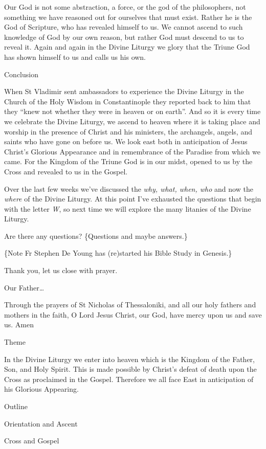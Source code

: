 \documentclass[
]{article}
\begin{document}
Our God is not some abstraction, a force, or the god of the
philosophers, not something we have reasoned out for ourselves that must
exist. Rather he is the God of Scripture, who has revealed himself to
us. We cannot ascend to such knowledge of God by our own reason, but
rather God must descend to us to reveal it. Again and again in the
Divine Liturgy we glory that the Triune God has shown himself to us and
calls us his own.

Conclusion

When St Vladimir sent ambassadors to experience the Divine Liturgy in
the Church of the Holy Wisdom in Constantinople they reported back to
him that they ``knew not whether they were in heaven or on earth''. And
so it is every time we celebrate the Divine Liturgy, we ascend to heaven
where it is taking place and worship in the presence of Christ and his
ministers, the archangels, angels, and saints who have gone on before
us. We look east both in anticipation of Jesus Christ's Glorious
Appearance and in remembrance of the Paradise from which we came. For
the Kingdom of the Triune God is in our midst, opened to us by the Cross
and revealed to us in the Gospel.

Over the last few weeks we've discussed the \emph{why, what, when, who}
and now the \emph{where} of the Divine Liturgy. At this point I've
exhausted the questions that begin with the letter \emph{W}, so next
time we will explore the many litanies of the Divine Liturgy.

Are there any questions? \{Questions and maybe answers.\}

\{Note Fr Stephen De Young has (re)started his Bible Study in Genesis.\}

Thank you, let us close with prayer.

Our Father\ldots{}

Through the prayers of St Nicholas of Thessaloniki, and all our holy
fathers and mothers in the faith, O Lord Jesus Christ, our God, have
mercy upon us and save us. Amen

Theme

In the Divine Liturgy we enter into heaven which is the Kingdom of the
Father, Son, and Holy Spirit. This is made possible by Christ's defeat
of death upon the Cross as proclaimed in the Gospel. Therefore we all
face East in anticipation of his Glorious Appearing.

Outline

Orientation and Ascent

Cross and Gospel
\end{document}

